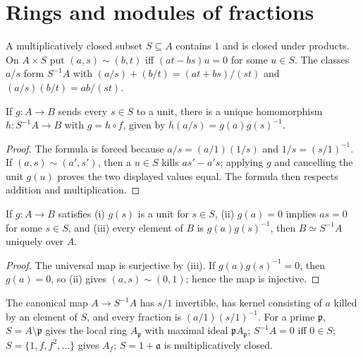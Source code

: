 \section{Rings and modules of fractions}
\label{am-ch3-fractions}
\begin{definition}
\label{am-def-localization}
\uses{}
A multiplicatively closed subset $S\subseteq A$ contains $1$ and is closed under
products.  On $A\times S$ put $(a,s)\sim(b,t)$ iff
$(at-bs)u=0$ for some $u\in S$.  The classes $a/s$ form $S^{-1}A$ with
$(a/s)+(b/t)=(at+bs)/(st)$ and $(a/s)(b/t)=ab/(st)$.
\end{definition}
\begin{proposition}
\label{am-prop-3-1}
\uses{}
If $g:A\to B$ sends every $s\in S$ to a unit, there is a unique homomorphism
$h:S^{-1}A\to B$ with $g=h\circ f$, given by $h(a/s)=g(a)g(s)^{-1}$.
\end{proposition}
\begin{proof}
The formula is forced because $a/s=(a/1)(1/s)$ and $1/s=(s/1)^{-1}$.
If $(a,s)\sim(a',s')$, then a $u\in S$ kills $as'-a's$; applying $g$ and
cancelling the unit $g(u)$ proves the two displayed values equal.  The formula
then respects addition and multiplication.
\end{proof}
\begin{corollary}
\label{am-cor-3-2}
\uses{}
If $g:A\to B$ satisfies (i) $g(s)$ is a unit for $s\in S$, (ii) $g(a)=0$
implies $as=0$ for some $s\in S$, and (iii) every element of $B$ is
$g(a)g(s)^{-1}$, then $B\simeq S^{-1}A$ uniquely over $A$.
\end{corollary}
\begin{proof}
The universal map is surjective by (iii).  If $g(a)g(s)^{-1}=0$, then
$g(a)=0$, so (ii) gives $(a,s)\sim(0,1)$; hence the map is injective.
\end{proof}
\begin{remark}
\label{am-rem-basic-localizations}
\uses{}
The canonical map $A\to S^{-1}A$ has $s/1$ invertible, has kernel consisting
of $a$ killed by an element of $S$, and every fraction is $(a/1)(s/1)^{-1}$.
For a prime $\mathfrak{p}$, $S=A\setminus\mathfrak{p}$ gives the local ring $A_\mathfrak{p}$ with maximal
ideal $\mathfrak{p} A_\mathfrak{p}$; $S^{-1}A=0$ iff $0\in S$; $S=\{1,f,f^2,\ldots\}$ gives
$A_f$; $S=1+\mathfrak{a}$ is multiplicatively closed.
\end{remark}
